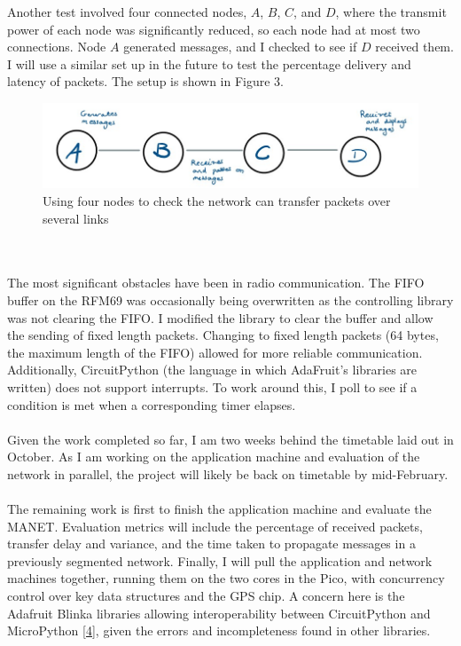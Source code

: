 \documentclass[10pt, a4paper]{article}
\begin{document}
Another test involved four connected nodes, $A$, $B$, $C$, and $D$, where the transmit power of each node was significantly reduced, so each node had at most two connections. Node $A$ generated messages, and I checked to see if $D$ received them. I will use a similar set up in the future to test the percentage delivery and latency of packets. The setup is shown in Figure 3.
\begin{figure}[h]
\caption{Using four nodes to check the network can transfer packets over several links}
\begin{center}
\includegraphics[scale=0.4]{test2.jpg}
\end{center}
\end{figure} \\ \\
The most significant obstacles have been in radio communication. The FIFO buffer on the RFM69 was occasionally being overwritten as the controlling library was not clearing the FIFO. I modified the library to clear the buffer and allow the sending of fixed length packets. Changing to fixed length packets (64 bytes, the maximum length of the FIFO) allowed for more reliable communication. Additionally, CircuitPython (the language in which AdaFruit's libraries are written) does not support interrupts. To work around this, I poll to see if a condition is met when a corresponding timer elapses. \\ \\
Given the work completed so far, I am two weeks behind the timetable laid out in October. As I am working on the application machine and evaluation of the network in parallel, the project will likely be back on timetable by mid-February. \\ \\
The remaining work is first to finish the application machine and evaluate the MANET. Evaluation metrics will include the percentage of received packets, transfer delay and variance, and the time taken to propagate messages in a previously segmented network. Finally, I will pull the application and network machines together, running them on the two cores in the Pico, with concurrency control over key data structures and the GPS chip. A concern here is the Adafruit Blinka libraries allowing interoperability between CircuitPython and MicroPython \hyperref[blinka]{[4]}, given the errors and incompleteness found in other libraries. 
\end{document}
